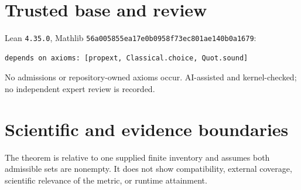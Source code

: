 \documentclass[11pt]{article}
\begin{document}
\section{Trusted base and review}
Lean \texttt{4.35.0}, Mathlib
\texttt{56a005855ea17e0b0958f73ec801ae140b0a1679}:
\begin{lstlisting}
depends on axioms: [propext, Classical.choice, Quot.sound]
\end{lstlisting}
No admissions or repository-owned axioms occur. AI-assisted and kernel-checked; no
independent expert review is recorded.
\section{Scientific and evidence boundaries}
The theorem is relative to one supplied finite inventory and assumes both admissible sets
are nonempty. It does not show compatibility, external coverage, scientific relevance of
the metric, or runtime attainment.
\end{document}
